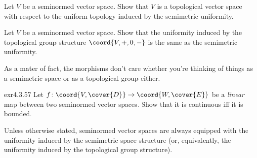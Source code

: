 \begin{exr}{}{}
Let $V$ be a seminormed vector space.  Show that $V$ is a topological vector space with respect to the uniform topology induced by the semimetric uniformity.
\end{exr}
\begin{exr}{}{}
Let $V$ be a seminormed vector space.  Show that the uniformity induced by the topological group structure $\coord{V,+,0,-}$ is the same as the semimetric uniformity.
\end{exr}
As a mater of fact, the morphisms don't care whether you're thinking of things as a semimetric space or as a topological group either.
\begin{exr}{}{exr4.3.57}
Let $f\colon \coord{V,\cover{D}}\rightarrow \coord{W,\cover{E}}$ be a \emph{linear} map between two seminormed vector spaces.  Show that it is continuous iff it is bounded.
\end{exr}
\begin{important}
Unless otherwise stated, seminormed vector spaces are always equipped with the uniformity induced by the semimetric space structure (or, equivalently, the uniformity induced by the topological group structure).
\end{important}

